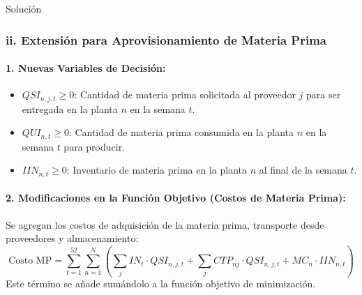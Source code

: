 \documentclass[11pt, a4paper]{article}
\begin{document}
\begin{ejercicio}{Solución}
  \subsubsection*{ii. Extensión para Aprovisionamiento de Materia Prima}

  \paragraph{1. Nuevas Variables de Decisión:}
  \begin{itemize}
    \item $QSI_{n,j,t} \ge 0$: Cantidad de materia prima solicitada al proveedor $j$ para ser entregada en la planta $n$ en la semana $t$.
    \item $QUI_{n,t} \ge 0$: Cantidad de materia prima consumida en la planta $n$ en la semana $t$ para producir.
    \item $IIN_{n,t} \ge 0$: Inventario de materia prima en la planta $n$ al final de la semana $t$.
  \end{itemize}

  \paragraph{2. Modificaciones en la Función Objetivo (Costos de Materia Prima):}
  Se agregan los costos de adquisición de la materia prima, transporte desde proveedores y almacenamiento:
  \begin{equation*}
    \text{Costo MP} = \sum_{t=1}^{52} \sum_{n=1}^{N} \left( \sum_{j} IN_t \cdot QSI_{n,j,t} + \sum_{j} CTP_{nj} \cdot QSI_{n,j,t} + MC_n \cdot IIN_{n,t} \right)
  \end{equation*}
  Este término se añade sumándolo a la función objetivo de minimización.


\end{ejercicio}
\end{document}

